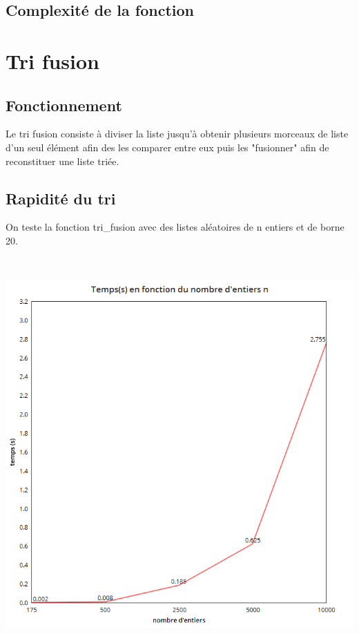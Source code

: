 \documentclass[a4paper, 12pt]{article}
\begin{document}
\subsection{Complexité de la fonction}











\section{Tri fusion}

\subsection{Fonctionnement}

Le tri fusion consiste à diviser la liste jusqu'à obtenir plusieurs morceaux de liste d'un seul élément afin des les comparer entre eux puis les "fusionner" afin de reconstituer une liste triée. 


\subsection{Rapidité du tri}

On teste la fonction tri\_fusion avec des listes aléatoires de n entiers et de borne 20.

~

\begin{center}
\includegraphics[scale=0.25]{trifusN.png}
\end{center}
~
\end{document}

